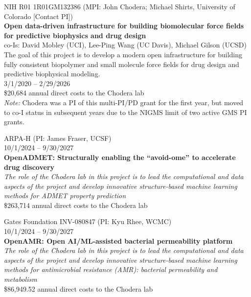 \documentclass[10pt]{article}
\begin{document}
\vspace{1.5ex}

NIH R01 1R01GM132386 (MPI: John Chodera; Michael Shirts, University of Colorado [Contact PI]) \\
{\bf Open data-driven infrastructure for building biomolecular force fields for predictive biophysics and drug design} \\
co-Is: David Mobley (UCI), Lee-Ping Wang (UC Davis), Michael Gilson (UCSD) \\
The goal of this project is to develop a modern open infrastructure for building fully consistent biopolymer and small molecule force fields for drug design and predictive biophysical modeling. \\
3/1/2020 -- 2/29/2026 \\
\$20,684 annual direct costs to the Chodera lab\\
\emph{Note:} Chodera was a PI of this multi-PI/PD grant for the first year, but moved to co-I status in subsequent years due to the NIGMS limit of two active GMS PI grants.

\vspace{1.5ex}

ARPA-H (PI: James Fraser, UCSF)\\
10/1/2024 -- 9/30/2027\\
{\bf OpenADMET: Structurally enabling the ``avoid-ome'' to accelerate drug discovery}\\
\emph{The role of the Chodera lab in this project is to lead the computational and data aspects of the project and develop innovative structure-based machine learning methods for ADMET property prediction}\\
\$263,714 annual direct costs to the Chodera lab

\vspace{1.5ex}

Gates Foundation INV-080847 (PI: Kyu Rhee, WCMC)\\
10/1/2024 -- 9/30/2027\\
{\bf OpenAMR: Open AI/ML-assisted bacterial permeability platform}\\
\emph{The role of the Chodera lab in this project is to lead the computational and data aspects of the project and develop innovative structure-based machine learning methods for antimicrobial resistance (AMR): bacterial permeability and metabolism}\\
\$86,949.52 annual direct costs to the Chodera lab

\end{document}
